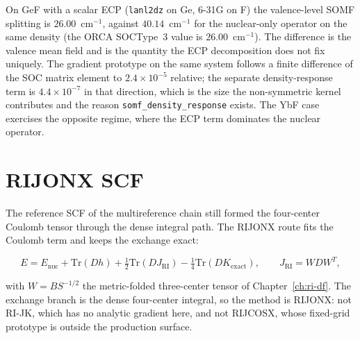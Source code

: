 On GeF with a scalar ECP (\texttt{lanl2dz} on Ge, 6-31G on F) the
valence-level SOMF splitting is $26.00$~cm$^{-1}$, against
$40.14$~cm$^{-1}$ for the nuclear-only operator on the same density
(the ORCA SOCType~3 value is $26.00$~cm$^{-1}$).  The difference is the
valence mean field and is the quantity the ECP decomposition does not
fix uniquely.
The gradient prototype on the same system follows a finite difference
of the SOC matrix element to $2.4\times10^{-5}$ relative; the separate
density-response term is $4.4\times10^{-7}$ in that direction, which is
the size the non-symmetric kernel contributes and the reason
\texttt{somf\_density\_response} exists.  The YbF case exercises the
opposite regime, where the ECP term dominates the nuclear operator.

\section{RIJONX SCF}
\label{sec:new-rijonx}

The reference SCF of the multireference chain still formed the
four-center Coulomb tensor through the dense integral path.  The RIJONX
route fits the Coulomb term and keeps the exchange exact:

\begin{equation}
  E = E_{\mathrm{nuc}} + \mathrm{Tr}(Dh)
    + \tfrac{1}{2}\mathrm{Tr}(D J_{\mathrm{RI}})
    - \tfrac{1}{4}\mathrm{Tr}(D K_{\mathrm{exact}}),
  \qquad
  J_{\mathrm{RI}} = W D W^{T},
  \label{eq:new-rijonx}
\end{equation}

with $W = B S^{-1/2}$ the metric-folded three-center tensor of
Chapter~\ref{ch:ri-df}.  The exchange branch is the dense four-center
integral, so the method is RIJONX: not RI-JK, which has no analytic
gradient here, and not RIJCOSX, whose fixed-grid prototype is outside
the production surface.

